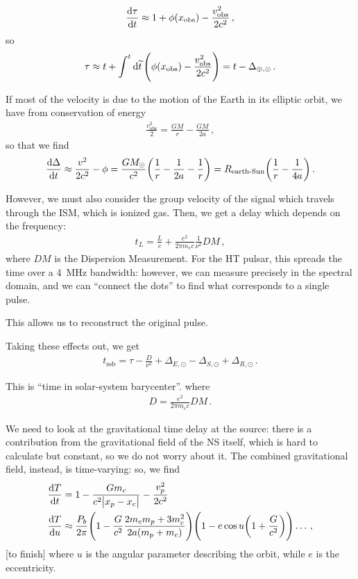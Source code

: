 \documentclass[main.tex]{subfiles}
\begin{document}
%
\begin{align}
\dv{\tau }{t} \approx 1 + \phi \qty(x _{\text{obs}}) - \frac{v^2 _{\text{obs}}}{2c^2}
\,,
\end{align}
%
so 
%
\begin{align}
\tau \approx t + \int^{t} \dd{\widetilde{t}} \qty(\phi \qty(x _{\text{obs}}) - \frac{v^2 _{\text{obs}}}{2c^2})
= t - \Delta_{\oplus, \odot}
\,.
\end{align}

If most of the velocity is due to the motion of the Earth in its elliptic orbit, we have from conservation of energy
%
\begin{align}
\frac{v^2 _{\text{obs}}}{2} = \frac{GM}{r} - \frac{GM}{2a}
\,,
\end{align}
%
so that we find 
%
\begin{align}
\dv{ \Delta}{t} \approx \frac{v^2}{2c^2} - \phi = \frac{GM_{\odot}}{c^2} \qty( \frac{1}{r} - \frac{1}{2a} - \frac{1}{r})
= R_{\text{earth-Sun}} \qty( \frac{1}{r} - \frac{1}{4a})
\,.
\end{align}

However, we must also consider the group velocity of the signal which travels through the ISM, which is ionized gas. Then, we get a delay which depends on the frequency: 
%
\begin{align}
t_L = \frac{L}{c} + \frac{e^2}{2 \pi m_e c} \frac{1}{\nu^2} DM
\,,
\end{align}
%
where \(DM\) is the Dispersion Measurement. 
For the HT pulsar, this spreads the time over a \SI{4}{MHz} bandwidth: 
however, we can measure precisely in the spectral domain, and we can ``connect the dots'' to find what corresponds to a single pulse. 

This allows us to reconstruct the original pulse.

Taking these effects out, we get 
%
\begin{align}
t _{\text{ssb}} = \tau - \frac{D}{\nu^2} + \Delta_{E, {\odot}} - \Delta_{S, {\odot}} + \Delta_{R, {\odot}}
\,.
\end{align}

This is ``time in solar-system barycenter''.
where
%
\begin{align}
D = \frac{e^2}{2 \pi m_e c} DM
\,.
\end{align}

We need to look at the gravitational time delay at the source: there is a contribution from the gravitational field of the NS itself, which is hard to calculate but constant, so we do not worry about it. 
The combined gravitational field, instead, is time-varying: so, we find 
%
\begin{subequations}
\begin{align}
\dv{T}{t} &= 1 - \frac{G m_c}{c^2 \abs{x_p - x_c}} - \frac{v_p^2}{2 c^2}  \\
 \dv{T}{u} &\approx \frac{P_b}{2 \pi } \qty(1 - \frac{G}{c^2} \frac{2 m_c m_p + 3 m_c^2}{2 a (m_p + m_c)})\qty(1 - e \cos u \qty(1 + \frac{G}{c^2})) \dots
\,,
\end{align}
\end{subequations}
%
[to finish]
where \(u\) is the angular parameter describing the orbit, while \(e\) is the eccentricity.
\end{document}
